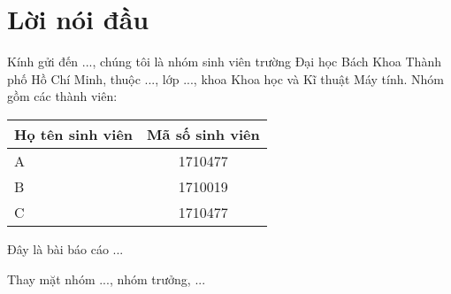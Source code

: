 \section*{Lời nói đầu}

Kính gửi đến ..., chúng tôi là nhóm sinh viên trường Đại học Bách Khoa Thành phố Hồ Chí Minh, thuộc ..., lớp ..., khoa Khoa học và Kĩ thuật Máy tính. Nhóm gồm các thành viên: 

\begin{table*}[h!]
	\centering
	\begin{tabular}{|l|c|}
		\hline
		\multicolumn{1}{|c|}{\textbf{Họ tên sinh viên}} & \textbf{Mã số sinh viên} \\ \hline
		A        & 1710477                \\ \hline
		B         & 1710019                \\ \hline
		C          & 1710477                \\ \hline
	\end{tabular}
\end{table*}

Đây là bài báo cáo ...


\begin{flushright}
	Thay mặt nhóm ..., nhóm trưởng, ...
\end{flushright}